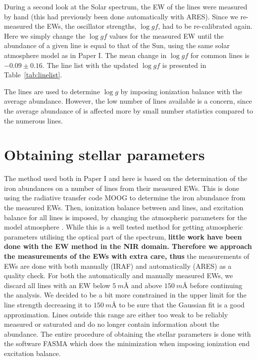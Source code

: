 \documentclass{aa}
\begin{document}
During a second look at the Solar spectrum, the EW of the lines were measured by
hand (this had previously been done automatically with ARES). Since we
re-measured the EWs, the oscillator strengths, $\log \mathit{gf}$, had to be
re-calibrated again. Here we simply change the $\log \mathit{gf}$ values for the
measured EW until the abundance of a given line is equal to that of the Sun,
using the same solar atmosphere model as in Paper I. The mean change in $\log
\mathit{gf}$ for common lines is $-0.09 \pm 0.16$. The line list with the
updated $\log \mathit{gf}$ is presented in Table~\ref{tab:linelist}.

The  lines are used to determine $\log g$ by imposing ionization
balance with the average  abundance. However, the low number of
 lines available is a concern, since the average abundance of
 is affected more by small number statistics compared to the
numerous  lines.


\section{Obtaining stellar parameters}
\label{sec:method}

The method used both in Paper I and here is based on the determination of the iron abundances
on a number of lines from their measured EWs. This is done using the radiative transfer code MOOG
\citep{Sneden1973} to determine the iron abundance from the measured EWs. Then, ionization balance
between  and  lines, and excitation balance for all  lines is
imposed, by changing the atmospheric parameters for the model atmosphere \citep[][ATLAS9 is used
here]{Kurucz1993}. While this is a well tested method for getting atmospheric parameters utilising
the optical part of the spectrum, {\bf little work have been done with the EW method in the NIR
domain. Therefore we approach the measurements of the EWs with extra care, thus} the measurements of
EWs are done with both manually (IRAF) and automatically (ARES) as a quality check. For both the
automatically and manually measured EWs, we discard all lines with an EW below $\SI{5}{m}$\AA{} and
above $\SI{150}{m}$\AA{} before continuing the analysis. We decided to be a bit more constrained in
the upper limit for the line strength decreasing it to $\SI{150}{m}$\AA{} to be sure that the
Gaussian fit is a good approximation. Lines outside this range are either too weak to be reliably
measured or saturated and do no longer contain information about the abundance. The entire procedure
of obtaining the stellar parameters is done with the software FASMA \citep{Andreasen2017a} which
does the minimization when imposing ionization end excitation balance.
\end{document}

